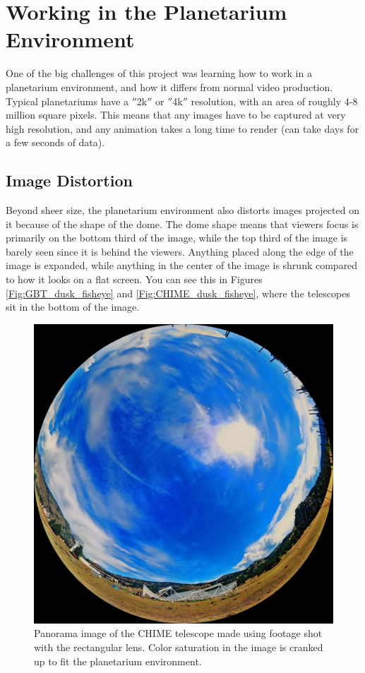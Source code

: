 \section{Working in the Planetarium Environment}

One of the big challenges of this project was learning how to work in a planetarium environment, and how it differs from normal video production. Typical planetariums have a $''$2k$''$ or $''$4k$''$ resolution, with an area of roughly 4-8 million square pixels. This means that any images have to be captured at very high resolution, and any animation takes a long time to render (can take days for a few seconds of data). 


\subsection{Image Distortion}

Beyond sheer size, the planetarium environment also distorts images projected on it because of the shape of the dome. The dome shape means that viewers focus is primarily on the bottom third of the image, while the top third of the image is barely seen since it is behind the viewers. Anything placed along the edge of the image is expanded, while anything in the center of the image is shrunk compared to how it looks on a flat screen. You can see this in Figures \ref{Fig:GBT_dusk_fisheye} and \ref{Fig:CHIME_dusk_fisheye}, where the telescopes sit in the bottom of the image. 

\begin{figure}[htb]
\begin{center}
\includegraphics[width=0.95\linewidth]{Planetarium/figures/CHIME_day_dome.jpg}
\caption{Panorama image of the CHIME telescope made using footage shot with the rectangular lens. Color saturation in the image is cranked up to fit the planetarium environment.}
\label{Fig:CHIME_day}
\end{center}
\end{figure}


